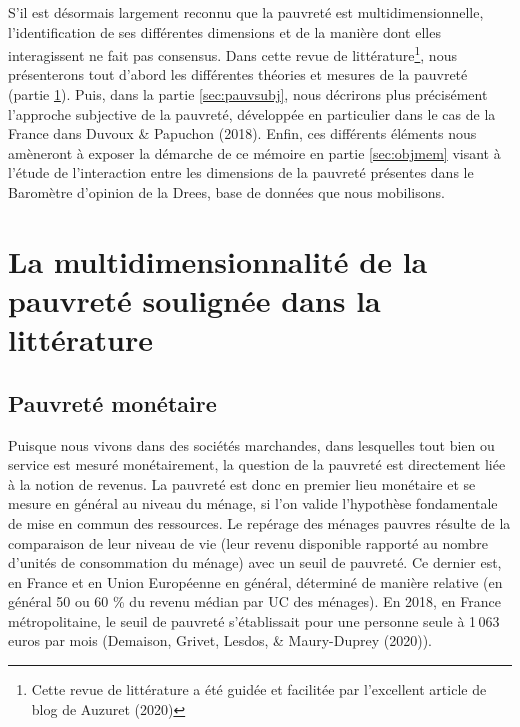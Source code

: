 \documentclass[12pt,a4paper]{reedthesis}
\begin{document}
S'il est désormais largement reconnu que la pauvreté est multidimensionnelle, l'identification de ses différentes dimensions et de la manière dont elles interagissent ne fait pas consensus. Dans cette revue de littérature\footnote{Cette revue de littérature a été guidée et facilitée par l'excellent article de blog de Auzuret (2020)}, nous présenterons tout d'abord les différentes théories et mesures de la pauvreté (partie \ref{sec:multidim}). Puis, dans la partie \ref{sec:pauvsubj}, nous décrirons plus précisément l'approche subjective de la pauvreté, développée en particulier dans le cas de la France dans Duvoux \& Papuchon (2018). Enfin, ces différents éléments nous amèneront à exposer la démarche de ce mémoire en partie \ref{sec:objmem} visant à l'étude de l'interaction entre les dimensions de la pauvreté présentes dans le Baromètre d'opinion de la Drees, base de données que nous mobilisons.

\hypertarget{sec:multidim}{%
\section{La multidimensionnalité de la pauvreté soulignée dans la littérature}\label{sec:multidim}}

\hypertarget{sec:monetaire}{%
\subsection{Pauvreté monétaire}\label{sec:monetaire}}

Puisque nous vivons dans des sociétés marchandes, dans lesquelles tout bien ou service est mesuré monétairement, la question de la pauvreté est directement liée à la notion de revenus. La pauvreté est donc en premier lieu monétaire et se mesure en général au niveau du ménage, si l'on valide l'hypothèse fondamentale de mise en commun des ressources. Le repérage des ménages pauvres résulte de la comparaison de leur niveau de vie (leur revenu disponible rapporté au nombre d'unités de consommation du ménage) avec un seuil de pauvreté. Ce dernier est, en France et en Union Européenne en général, déterminé de manière relative (en général 50 ou 60 \% du revenu médian par UC des ménages). En 2018, en France métropolitaine, le seuil de pauvreté s'établissait pour une personne seule à 1\,063 euros par mois (Demaison, Grivet, Lesdos, \& Maury-Duprey (2020)).
\end{document}
